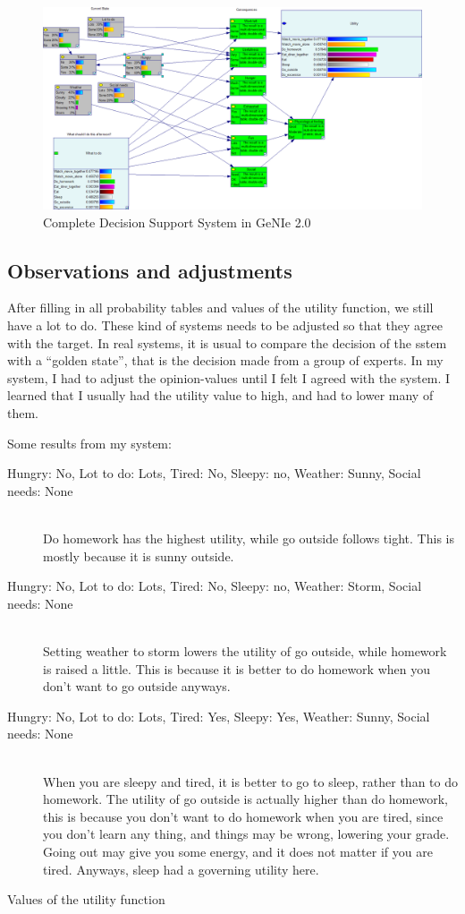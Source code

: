 \begin{figure}[h]
\includegraphics[width=154mm]{figure-complete.png}
\caption{Complete Decision Support System in GeNIe 2.0}
\label{fig:complete}
\end{figure}

\subsection{Observations and adjustments}
After filling in all probability tables and values of the utility function, we
still have a lot to do. These kind of systems needs to be adjusted so that they
agree with the target. In real systems, it is usual to compare the decision of
the sstem with a ``golden state'', that is the decision made from a group of
experts. In my system, I had to adjust the opinion-values until I felt I agreed
with the system. I learned that I usually had the utility value to high, and had
to lower many of them.

Some results from my system:\\
\begin{description}
\item[Hungry: No, Lot to do: Lots, Tired: No, Sleepy: no, Weather: Sunny,
Social needs: None]\\
Do homework has the highest utility, while go outside follows tight. This is
mostly because it is sunny outside.
\item[Hungry: No, Lot to do: Lots, Tired: No, Sleepy: no, Weather: Storm,
Social needs: None]\\
Setting weather to storm lowers the utility of go outside, while homework is
raised a little. This is because it is better to do homework when you don't want
to go outside anyways.
\item[Hungry: No, Lot to do: Lots, Tired: Yes, Sleepy: Yes, Weather: Sunny,
Social needs: None]\\
When you are sleepy and tired, it is better to go to sleep, rather than to do
homework. The utility of go outside is actually higher than do homework, this is
because you don't want to do homework when you are tired, since you don't learn
any thing, and things may be wrong, lowering your grade. Going out may give you
some energy, and it does not matter if you are tired. Anyways, sleep had a
governing utility here.
\end{description}


\begin{table}

\label{Some values from the utility function}
\label{tab:utility}
\caption{Values of the utility function}
\end{table}
